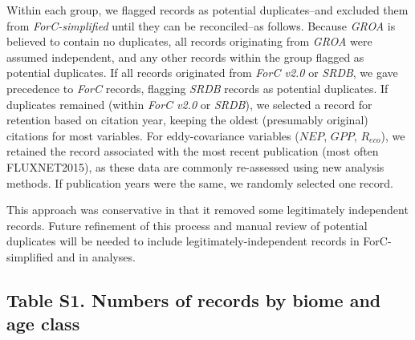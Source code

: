 \documentclass[
]{article}
\begin{document}
Within each group, we flagged records as potential duplicates--and
excluded them from \emph{ForC-simplified} until they can be
reconciled--as follows. Because \emph{GROA} is believed to contain no
duplicates, all records originating from \emph{GROA} were assumed
independent, and any other records within the group flagged as potential
duplicates. If all records originated from \emph{ForC v2.0} or
\emph{SRDB}, we gave precedence to \emph{ForC} records, flagging
\emph{SRDB} records as potential duplicates. If duplicates remained
(within \emph{ForC v2.0} or \emph{SRDB}), we selected a record for
retention based on citation year, keeping the oldest (presumably
original) citations for most variables. For eddy-covariance variables
(\(NEP\), \(GPP\), \(R_{eco}\)), we retained the record associated with
the most recent publication (most often FLUXNET2015), as these data are
commonly re-assessed using new analysis methods. If publication years
were the same, we randomly selected one record.

This approach was conservative in that it removed some legitimately
independent records. Future refinement of this process and manual review
of potential duplicates will be needed to include
legitimately-independent records in ForC-simplified and in analyses.

\newpage

\hypertarget{table-s1.-numbers-of-records-by-biome-and-age-class}{%
\subsection{Table S1. Numbers of records by biome and age
class}\label{table-s1.-numbers-of-records-by-biome-and-age-class}}
\end{document}
